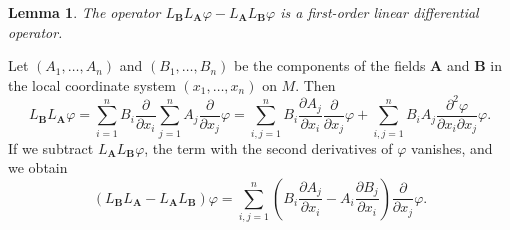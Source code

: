 \documentclass{book}
\numberwithin{equation}{section}
\theoremstyle{plain}
\newtheorem{lem}[thm]{Lemma} %
\let\oldendproof\endproof
\renewenvironment{proof}[1][\proofname]{%
  \oldproof[\textsc{#1}]%
}{\oldendproof}
\theoremstyle{definition}
\theoremstyle{remark}
\theoremstyle{smallcap}
\numberwithin{prob}{section}
\begin{document}
\begin{lem}
  The operator
  $L_\mathbf{B} L_\mathbf{A} \varphi-L_\mathbf{A} L_\mathbf{B} \varphi$
  is a first-order linear differential operator.
\end{lem}

\begin{proof}
  Let $(A_1, \dots, A_n)$ and $(B_1, \dots, B_n)$
  be the components of the fields $\mathbf A$ and $\mathbf B$
  in the local coordinate system $(x_1, \dots, x_n)$ on $M$.
  Then
  $$
  L_\mathbf{B} L_\mathbf{A} \varphi
  =
  \sum_{i=1}^n B_i \frac{\partial}{\partial x_i}
  \sum_{j=1}^n A_j \frac{\partial}{\partial x_j} \varphi
  =
  \sum_{i,j=1}^n
    B_i \frac{\partial A_j}{\partial x_i}
    \frac{\partial}{\partial x_j} \varphi
  +
  \sum_{i,j=1}^n
    B_i A_j
    \frac{\partial^2 \varphi}{\partial x_i \partial x_j} \varphi.
  $$
  If we subtract $L_\mathbf{A} L_\mathbf{B} \varphi$,
  the term with the second derivatives of $\varphi$ vanishes,
  and we obtain
  $$
  (L_\mathbf{B} L_\mathbf{A} - L_\mathbf{A} L_\mathbf{B}) \varphi
  =
  \sum_{i,j=1}^n
    \left(
      B_i \frac{\partial A_j}{\partial x_i}
      -
      A_i \frac{\partial B_j}{\partial x_i}
    \right)
    \frac{\partial}{\partial x_j} \varphi.
  $$
\end{proof}
\end{document}
